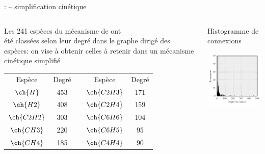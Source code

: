 \documentclass[aspectratio=169,pdf,t]{beamer}
\begin{document}
\begin{frame}{\insertsection}{\insertsubsection:  -- simplification cinétique}
	\begin{columns}[T]
		\begin{column}{0.5\textwidth}
			\centering{}
			
			\begin{flushleft}
				Les 241 espèces du mécanisme de \citet{Norinaga2009} ont\\ été classées selon leur degré dans le graphe dirigé des espèces: on vise à obtenir celles à retenir dans un mécanisme cinétique simplifié
			\end{flushleft}

			\vspace{0.6cm}
		  \begin{tabular}{ccccc}
			  	\cmidrule[2pt]{1-2} \cmidrule[2pt]{4-5} 
			  	Espèce      & Degré  &  & Espèce      & Degré  \tabularnewline
			  	\cmidrule[2pt]{1-2} \cmidrule[2pt]{4-5} 
			  	$\ch{H}$    & 453    &  & $\ch{C2H3}$ & 171    \tabularnewline
			  	$\ch{H2}$   & 408    &  & $\ch{C2H4}$ & 159    \tabularnewline
			  	$\ch{C2H2}$ & 303    &  & $\ch{C6H6}$ & 104    \tabularnewline
			  	$\ch{CH3}$  & 220    &  & $\ch{C6H5}$ & 95     \tabularnewline
			  	$\ch{CH4}$  & 185    &  & $\ch{C4H4}$ & 90     \tabularnewline
			  	\cmidrule{1-2} \cmidrule{4-5} 
		  \end{tabular}
		\end{column}
		\begin{column}{0.5\textwidth}
			\centering{}
			Histogramme de connexions
				
			\includegraphics[width=6cm]{figures/digraph-norinaga2009-histogram}
		\end{column}
	\end{columns}
\end{frame}
\end{document}
